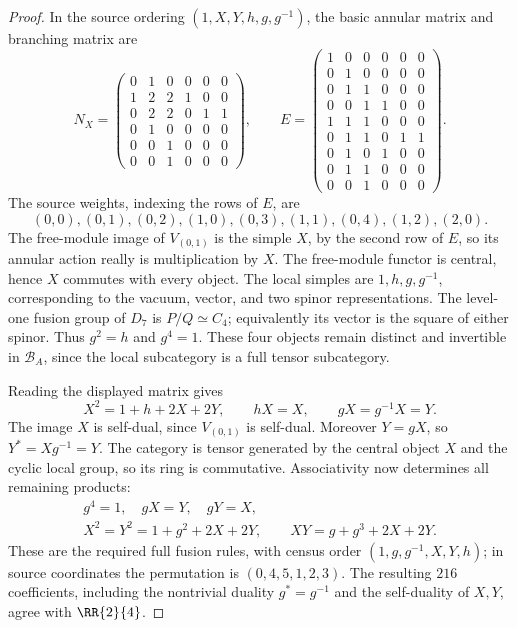 \begin{proof}
In the source ordering $(1,X,Y,h,g,g^{-1})$, the basic annular matrix
and branching matrix are
\[
 N_X=\begin{pmatrix}
 0&1&0&0&0&0\\1&2&2&1&0&0\\0&2&2&0&1&1\\
 0&1&0&0&0&0\\0&0&1&0&0&0\\0&0&1&0&0&0
 \end{pmatrix},\qquad
 E=\begin{pmatrix}
 1&0&0&0&0&0\\0&1&0&0&0&0\\0&1&1&0&0&0\\
 0&0&1&1&0&0\\1&1&1&0&0&0\\0&1&1&0&1&1\\
 0&1&0&1&0&0\\0&1&1&0&0&0\\0&0&1&0&0&0
 \end{pmatrix}.
\]
The source weights, indexing the rows of $E$, are
\[
 (0,0),(0,1),(0,2),(1,0),(0,3),(1,1),(0,4),(1,2),(2,0).
\]
The free-module image of $V_{(0,1)}$ is the simple $X$, by the second
row of $E$, so its annular action really is multiplication by $X$.
The free-module functor is central, hence $X$ commutes with every
object. The local simples are $1,h,g,g^{-1}$, corresponding to the
vacuum, vector, and two spinor representations. The level-one fusion
group of $D_7$ is $P/Q\simeq C_4$; equivalently its vector is the square
of either spinor. Thus $g^2=h$ and $g^4=1$. These four objects remain
distinct and invertible in $\mathcal B_A$, since the local subcategory
is a full tensor subcategory.

Reading the displayed matrix gives
\[
 X^2=1+h+2X+2Y,\qquad hX=X,\qquad gX=g^{-1}X=Y.
\]
The image $X$ is self-dual, since $V_{(0,1)}$ is self-dual. Moreover
$Y=gX$, so $Y^*=Xg^{-1}=Y$. The category is tensor generated by the
central object $X$ and the cyclic local group, so its ring is
commutative. Associativity now determines all remaining products:
\begin{equation}\label{eq:g2-e4-rules}
 \begin{gathered}
 g^4=1,\quad gX=Y,\quad gY=X,\\
 X^2=Y^2=1+g^2+2X+2Y,\qquad
 XY=g+g^3+2X+2Y.
 \end{gathered}
\end{equation}
These are the required full fusion rules, with census order
$(1,g,g^{-1},X,Y,h)$; in source coordinates the permutation is
$(0,4,5,1,2,3)$. The resulting $216$ coefficients, including the
nontrivial duality $g^*=g^{-1}$ and the self-duality of $X,Y$, agree
with $\RR{2}{4}$.
\end{proof}

